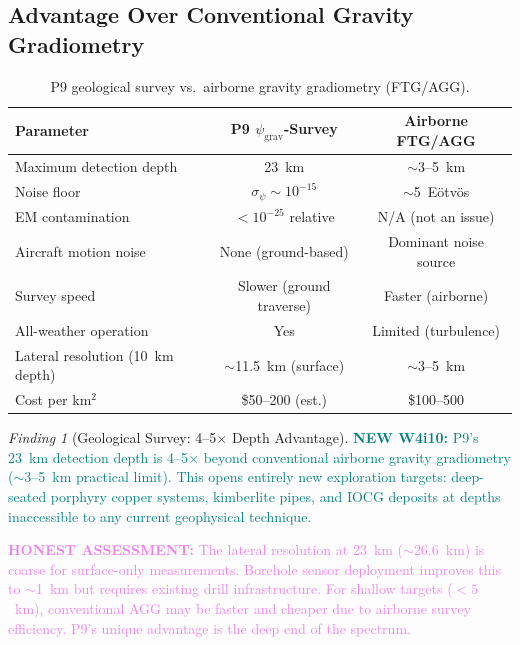 \documentclass[11pt]{article}
\theoremstyle{definition}
\theoremstyle{remark}
\newtheorem{finding}[theorem]{Finding}
\newcommand{\psigrav}{\psi_{\mathrm{grav}}}
\newcommand{\honest}[1]{\textcolor{violet}{\textbf{HONEST ASSESSMENT:} #1}}
\newcommand{\newfinding}[1]{\textcolor{teal}{\textbf{NEW W4i10:} #1}}
\begin{document}
\subsection{Advantage Over Conventional Gravity Gradiometry}

\begin{table}[H]
\centering
\caption{P9 geological survey vs.\ airborne gravity gradiometry (FTG/AGG).}
\label{tab:p9-vs-agg}
\begin{tabular}{@{}p{4cm}cc@{}}
\toprule
Parameter & P9 $\psigrav$-Survey & Airborne FTG/AGG \\
\midrule
Maximum detection depth & 23~km & $\sim$3--5~km \\
Noise floor & $\sigma_\psi \sim 10^{-15}$ & $\sim$5~E\"otv\"os \\
EM contamination & $< 10^{-25}$ relative & N/A (not an issue) \\
Aircraft motion noise & None (ground-based) & Dominant noise source \\
Survey speed & Slower (ground traverse) & Faster (airborne) \\
All-weather operation & Yes & Limited (turbulence) \\
Lateral resolution (10~km depth) & $\sim$11.5~km (surface) & $\sim$3--5~km \\
Cost per km$^2$ & \$50--200 (est.) & \$100--500 \\
\bottomrule
\end{tabular}
\end{table}

\begin{finding}[Geological Survey: 4--5$\times$ Depth Advantage]
\label{find:geo-depth}
\newfinding{P9's 23~km detection depth is 4--5$\times$ beyond conventional
airborne gravity gradiometry ($\sim$3--5~km practical limit). This opens
entirely new exploration targets: deep-seated porphyry copper systems,
kimberlite pipes, and IOCG deposits at depths inaccessible to any current
geophysical technique.}

\honest{The lateral resolution at 23~km ($\sim$26.6~km) is coarse for
surface-only measurements. Borehole sensor deployment improves this to
$\sim$1~km but requires existing drill infrastructure. For shallow targets
($<5$~km), conventional AGG may be faster and cheaper due to airborne
survey efficiency. P9's unique advantage is the deep end of the spectrum.}
\end{finding}

\end{document}
